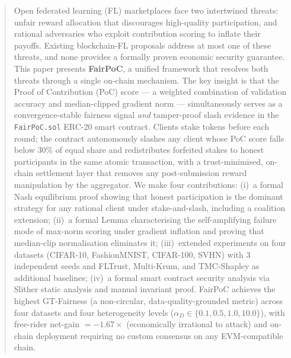 \documentclass[journal]{IEEEtran}
\theoremstyle{definition}
\theoremstyle{remark}
\begin{document}
\begin{abstract}
Open federated learning (FL) marketplaces face two intertwined
threats: unfair reward allocation that discourages high-quality
participation, and rational adversaries who exploit contribution
scoring to inflate their payoffs.
Existing blockchain-FL proposals address at most one of these threats,
and none provides a formally proven economic security guarantee.
This paper presents \textbf{FairPoC}, a unified framework that
resolves both threats through a single on-chain mechanism.
The key insight is that the Proof of Contribution (PoC) score ---
a weighted combination of validation accuracy and median-clipped
gradient norm --- simultaneously serves as a convergence-stable
fairness signal \emph{and} tamper-proof slash evidence in the
\texttt{FairPoC.sol} ERC-20 smart contract.
Clients stake tokens before each round; the contract autonomously
slashes any client whose PoC score falls below $30\%$ of equal
share and redistributes forfeited stakes to honest participants
in the same atomic transaction, with a trust-minimised, on-chain
settlement layer that removes any post-submission reward manipulation
by the aggregator.
We make four contributions:
(i)~a formal Nash equilibrium proof showing that honest
participation is the dominant strategy for any rational client
under stake-and-slash, including a coalition extension;
(ii)~a formal Lemma characterising the self-amplifying failure mode
of max-norm scoring under gradient inflation and proving that
median-clip normalisation eliminates it;
(iii)~extended experiments on four datasets (CIFAR-10, FashionMNIST,
CIFAR-100, SVHN) with 3 independent seeds and FLTrust, Multi-Krum,
and TMC-Shapley as additional baselines;
(iv)~a formal smart contract security analysis via Slither static
analysis and manual invariant proof.
FairPoC achieves the highest GT-Fairness (a non-circular,
data-quality-grounded metric) across four datasets and four
heterogeneity levels ($\alpha_D \in \{0.1, 0.5, 1.0, 10.0\}$),
with free-rider net-gain $= {-}1.67{\times}$ (economically
irrational to attack) and on-chain deployment requiring no
custom consensus on any EVM-compatible chain.
\end{abstract}
\end{document}
